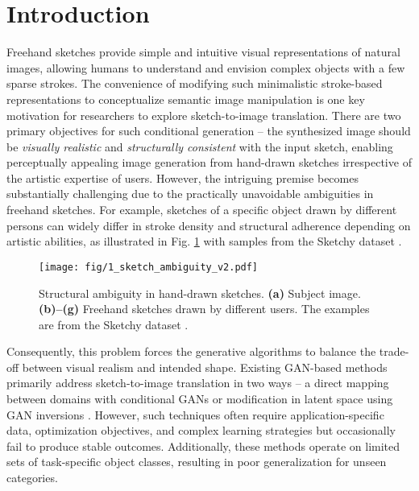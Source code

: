 \section{Introduction}
\label{sec:introduction}

Freehand sketches provide simple and intuitive visual representations of natural images, allowing humans to understand and envision complex objects with a few sparse strokes. The convenience of modifying such minimalistic stroke-based representations to conceptualize semantic image manipulation is one key motivation for researchers to explore sketch-to-image translation. There are two primary objectives for such conditional generation -- the synthesized image should be \emph{visually realistic} and \emph{structurally consistent} with the input sketch, enabling perceptually appealing image generation from hand-drawn sketches irrespective of the artistic expertise of users. However, the intriguing premise becomes substantially challenging due to the practically unavoidable ambiguities in freehand sketches. For example, sketches of a specific object drawn by different persons can widely differ in stroke density and structural adherence depending on artistic abilities, as illustrated in Fig. \ref{fig:sketch_ambiguity} with samples from the Sketchy dataset \cite{sangkloy2016sketchy}.


\begin{figure}[h]
  \centering
  \texttt{[image: fig/1\_sketch\_ambiguity\_v2.pdf]}
  \caption{Structural ambiguity in hand-drawn sketches. \textbf{(a)} Subject image. \textbf{(b)--(g)} Freehand sketches drawn by different users. The examples are from the Sketchy dataset \cite{sangkloy2016sketchy}.}
  \label{fig:sketch_ambiguity}
\end{figure}


\noindent
Consequently, this problem forces the generative algorithms to balance the trade-off between visual realism and intended shape. Existing GAN-based \cite{goodfellow2014generative,mirza2014conditional} methods primarily address sketch-to-image translation in two ways -- a direct mapping between domains with conditional GANs \cite{chen2020deepfacedrawing,chen2018sketchygan,gao2020sketchycoco,ghosh2019interactive,isola2017image,li2019linestofacephoto,li2020deepfacepencil,lu2018image,wang2018high,zhu2017unpaired} or modification in latent space using GAN inversions \cite{an2023sketchinverter,zhu2016generative}. However, such techniques often require application-specific data, optimization objectives, and complex learning strategies but occasionally fail to produce stable outcomes. Additionally, these methods operate on limited sets of task-specific object classes, resulting in poor generalization for unseen categories.

